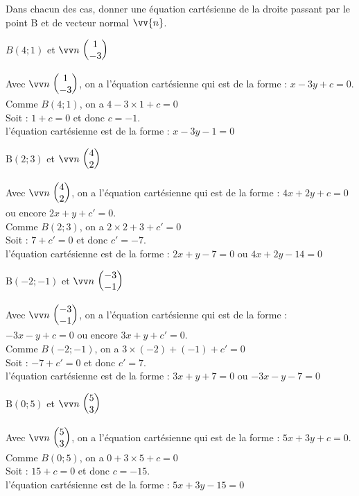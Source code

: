 \documentclass[11pt,a4paper]{article}  %
\begin{document}
Dans chacun des cas, donner une équation cartésienne de la droite passant par le point $\mathrm{B}$ et de vecteur normal $\vv{n}$.
\begin{enumMet}
	\item $B(4 ; 1)$ et $\Coord{n}{1}{-3}$
	\begin{corrBox}
		Avec $\Coord{n}{1}{-3}$, on a l'équation cartésienne qui est de la forme : $x-3y+c=0$.\\
		 Comme $B(4 ; 1)$, on a $4-3\times1+c=0$\\
		 Soit : $1+c=0$ et donc $c=-1$.\\
		 l'équation cartésienne est de la forme : $x-3y-1=0$
	\end{corrBox}
	\item $\mathrm{B}(2 ; 3)$ et $\Coord{n}{4}{2}$
	\begin{corrBox}
		Avec $\Coord{n}{4}{2}$, on a l'équation cartésienne qui est de la forme : $4x+2y+c=0$ ou encore $2x+y+c'=0$.\\
		Comme $B(2 ; 3)$, on a $2\times2+3+c'=0$\\
		Soit : $7+c'=0$ et donc $c'=-7$.\\
		l'équation cartésienne est de la forme : $2x+y-7=0$ ou $4x+2y-14=0$
	\end{corrBox}
	\item $\mathrm{B}(-2 ;-1)$ et $\Coord{n}{-3}{-1}$
	\begin{corrBox}
		Avec $\Coord{n}{-3}{-1}$, on a l'équation cartésienne qui est de la forme : $-3x-y+c=0$ ou encore $3x+y+c'=0$.\\
		Comme $B(-2 ; -1)$, on a $3\times(-2)+(-1)+c'=0$\\
		Soit : $-7+c'=0$ et donc $c'=7$.\\
		l'équation cartésienne est de la forme : $3x+y+7=0$ ou $-3x-y-7=0$
	\end{corrBox}
	\item $\mathrm{B}(0 ; 5)$ et $\Coord{n}{5}{3}$
	\begin{corrBox}
		Avec $\Coord{n}{5}{3}$, on a l'équation cartésienne qui est de la forme : $5x+3y+c=0$.\\
		Comme $B(0 ; 5)$, on a $0+3\times5+c=0$\\
		Soit : $15+c=0$ et donc $c=-15$.\\
		l'équation cartésienne est de la forme : $5x+3y-15=0$
	\end{corrBox}
\end{enumMet}
\end{document}
